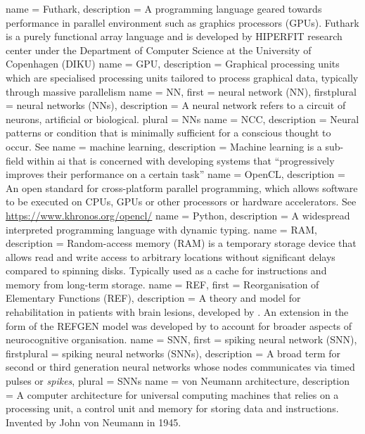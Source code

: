  {
   name = {Futhark},
   description = {A programming language geared towards performance in parallel environment such as
   graphics processors (GPUs). Futhark is a purely functional array language and is
   developed by HIPERFIT research center under the Department of Computer Science at the
   University of Copenhagen (DIKU)}
}
 {
  name = GPU,
  description = {Graphical processing units which are specialised processing units
                 tailored to process graphical data, typically through massive parallelism}
}
 {
  name = {NN},
  first = {neural network (NN)},
  firstplural = {neural networks (NNs)},
  description = {A neural network refers to a circuit of neurons, artificial or biological.}
  plural = {NNs}
}
 {
   name = {NCC},
   description = {Neural patterns or condition that is minimally sufficient for a conscious
thought to occur. See \autocite{atkinson2000, Hohwy2009}}
}
 {
  name = machine learning,
  description = {Machine learning is a sub-field within \gls{ai} that is concerned
    with developing systems that ``progressively improves their performance on a
    certain task'' \autocite{wiki:ml}}
}
 {
   name = {OpenCL},
   description = {An open standard for cross-platform parallel programming, which
   allows software to be executed on CPUs, GPUs or other processors or hardware accelerators. See \url{
   https://www.khronos.org/opencl/}}
}
 {
  name = Python,
  description = {A widespread interpreted programming language with dynamic
  typing.}
}
 {
  name = RAM,
  description = {Random-access memory (RAM) is a temporary storage device
	         that allows read and write access to arbitrary locations
		 without significant delays compared to spinning disks.
		 Typically used as a cache for instructions and memory
		 from long-term storage.}
}
 {
  name = REF,
  first = {Reorganisation of Elementary Functions (REF)},
  description = {A theory and model for rehabilitation in patients
  with brain lesions, developed by \cite{Mogensen2011}.
  An extension in the form of the REFGEN model was developed by
  \textcite{Mogensen2017} to account for broader aspects of
  neurocognitive organisation.}
}
 {
  name = SNN,
  first = {spiking neural network (SNN)},
  firstplural = {spiking neural networks (SNNs)},
  description = {A broad term for second or third generation neural
                 networks whose nodes communicates via timed pulses or
		 \textit{spikes}},
  plural = {SNNs}
}
 {
  name = {von Neumann architecture},
  description = {A computer architecture for universal computing machines that
                 relies on a processing unit, a control unit and memory for
		 storing data and instructions. Invented by John von Neumann in
		 1945.}
}
